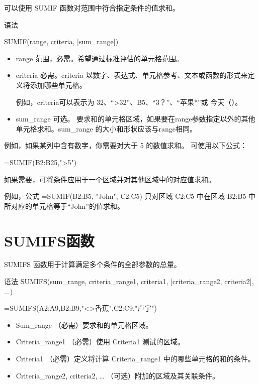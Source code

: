 可以使用 SUMIF 函数对范围中符合指定条件的值求和。

语法

SUMIF(range, criteria, [sum\_range])

\begin{itemize}
    \item range 范围，必需。希望通过标准评估的单元格范围。 
    \item criteria   必需。criteria 以数字、表达式、单元格参考、文本或函数的形式来定义将添加哪些单元格。
    
    例如，criteria可以表示为 32、“>32”、B5、“3？”、“苹果*”或 今天（）。
    \item sum\_range   可选。 要求和的单元格区域，如果要在range参数指定以外的其他单元格求和。sum\_range 的大小和形状应该与range相同。
\end{itemize}

例如，如果某列中含有数字，你需要对大于 5 的数值求和。 可使用以下公式：

=SUMIF(B2:B25,">5")

如果需要，可将条件应用于一个区域并对其他区域中的对应值求和。

例如，公式 =SUMIF(B2:B5, "John", C2:C5) 只对区域 C2:C5 中在区域 B2:B5 中所对应的单元格等于“John”的值求和。

\section{SUMIFS函数}

SUMIFS 函数用于计算满足多个条件的全部参数的总量。 

语法
SUMIFS(sum\_range, criteria\_range1, criteria1, [criteria\_range2, criteria2], ...)

=SUMIFS(A2:A9,B2:B9,"<>香蕉",C2:C9,"卢宁")

\begin{itemize}
    \item Sum\_range   （必需）要求和的单元格区域。
    \item Criteria\_range1   （必需）使用 Criteria1 测试的区域。
    \item Criteria1   （必需）定义将计算 Criteria\_range1 中的哪些单元格的和的条件。
    \item Criteria\_range2, criteria2, …    （可选）附加的区域及其关联条件。 
\end{itemize}